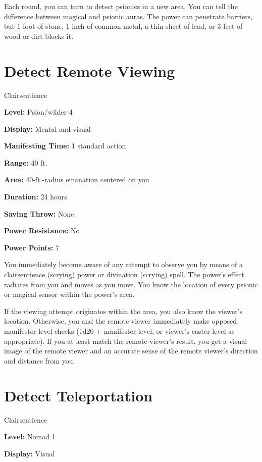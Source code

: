 \documentclass{article}
\begin{document}
\vspace{12pt}
Each round, you can turn to detect psionics in a new area. You can tell the difference 
between magical and psionic auras. The power can penetrate barriers, but 1 foot 
of stone, 1 inch of common metal, a thin sheet of lead, or 3 feet of wood or dirt 
blocks it.

\vspace{12pt}
\section*{Detect Remote Viewing}

Clairsentience

\textbf{Level:} Psion/wilder 4

\textbf{Display:} Mental and visual

\textbf{Manifesting Time:} 1 standard action

\textbf{Range:} 40 ft.

\textbf{Area:} 40-ft.-radius emanation centered on you

\textbf{Duration:} 24 hours

\textbf{Saving Throw:} None

\textbf{Power Resistance:} No

\textbf{Power Points:} 7

You immediately become aware of any attempt to observe you by means of a clairsentience 
(scrying) power or divination (scrying) spell. The power's effect radiates from 
you and moves as you move. You know the location of every psionic or magical sensor 
within the power's area.

If the viewing attempt originates within the area, you also know the viewer's location. 
Otherwise, you and the remote viewer immediately make opposed manifester level 
checks (1d20 + manifester level, or viewer's caster level as appropriate). If you 
at least match the remote viewer's result, you get a visual image of the remote 
viewer and an accurate sense of the remote viewer's direction and distance from 
you.

\vspace{12pt}
\section*{Detect Teleportation}

Clairsentience

\textbf{Level:} Nomad 1

\textbf{Display:} Visual
\end{document}
